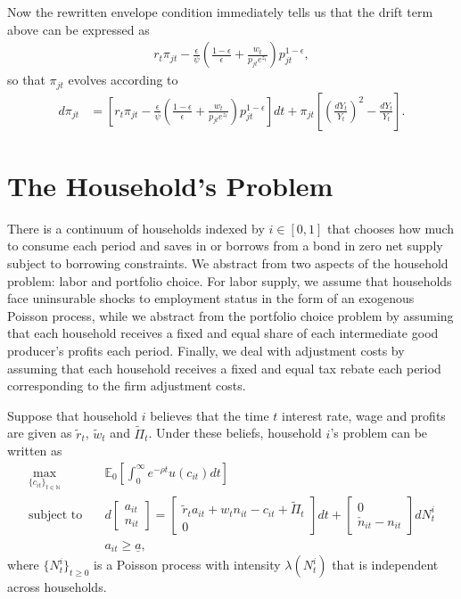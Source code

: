 \documentclass[notitlepage,a4paper,11pt]{report}
\numberwithin{section}{chapter}
\numberwithin{subsection}{section}
\newcommand{\expt}[2]{\mathbb{E}_{#1}\left[ #2 \right]}
\begin{document}
Now the rewritten envelope condition immediately tells us that the drift term above can be expressed as 
\begin{align*}
r_t  \pi_{jt} - \frac{\epsilon}{ \psi} \left( \frac{ 1-\epsilon}{\epsilon}  +  \frac{w_t}{ p_{jt} e^{z_t} } \right) p_{jt}^{1-\epsilon}, 
\end{align*} 
so that $\pi_{jt}$ evolves according to
\begin{align*}
d\pi_{jt} & = \left[ r_t  \pi_{jt} - \frac{\epsilon}{ \psi} \left( \frac{ 1-\epsilon}{\epsilon}  +  \frac{w_t}{ p_{jt} e^{z_t} } \right) p_{jt}^{1-\epsilon} \right] dt  +\pi_{jt} \left[  \left( \frac{dY_t}{Y_t} \right)^2 - \frac{dY_t}{Y_t}  \right].  
\end{align*}



\pagebreak




\section{The Household's Problem} 

There is a continuum of households indexed by $i \in [0,1]$ that chooses how much to consume each period and saves in or borrows from a bond in zero net supply subject to borrowing constraints. We abstract from two aspects of the household problem: labor and portfolio choice. For labor supply, we assume that households face uninsurable shocks to employment status in the form of an exogenous Poisson process, while we abstract from the portfolio choice problem by assuming that each household receives a fixed and equal share of each intermediate good producer's profits each period. Finally, we deal with adjustment costs by assuming that each household receives a fixed and equal tax rebate each period corresponding to the firm adjustment costs. 

Suppose that household $i$ believes that the time $t$ interest rate, wage and profits are given as $\tilde{r}_t$, $\tilde{w}_t$ and $\tilde{\Pi}_t$. Under these beliefs, household $i$'s problem can be written as 
\begin{align*}
\max_{ \{ c_{it} \}_{t \in \mathbb{N}}} & \quad \expt{0}{ \int_0^{\infty} e^{-\rho t} u( c_{it} ) dt  } \\[10pt]
\text{subject to} & \quad d \begin{bmatrix}
a_{it} \\
n_{it} 
\end{bmatrix} = \begin{bmatrix}
\tilde{r}_t a_{it} + w_t n_{it} - c_{it} + \tilde{\Pi}_t \\
0 
\end{bmatrix}  dt + \begin{bmatrix}
0 \\
\check{n}_{it} - n_{it} 
\end{bmatrix} d N_t^i
 \\[10pt]
& \quad a_{it} \geq \underline{a}, 
\end{align*}
where $\{ N_t^i \}_{t \geq 0}$ is a Poisson process with intensity $\lambda(N_t^i)$ that is independent across households. 
\end{document}
